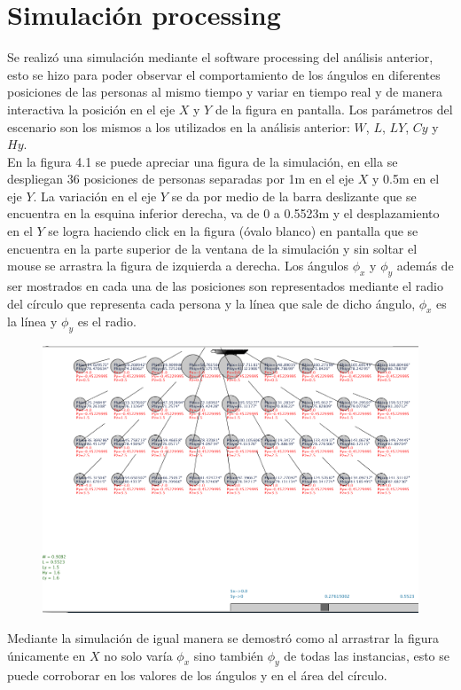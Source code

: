       
      \section{Simulación processing}
      Se realizó una simulación mediante el software processing del análisis anterior, esto se hizo para poder observar el comportamiento de los ángulos en diferentes posiciones de las personas al mismo tiempo y variar en tiempo real y de manera interactiva la posición en el eje $X$ y $Y$ de la figura en pantalla. Los parámetros del escenario son los mismos a los utilizados en la análisis anterior: $W$, $L$, $LY$, $Cy$ y $Hy$. \\
      En la figura 4.1 se puede apreciar una figura de la simulación, en ella se despliegan 36 posiciones de personas separadas por 1m en el eje $X$ y 0.5m en el eje $Y$. La variación en el eje $Y$ se da por medio de la barra deslizante que se encuentra en la esquina inferior derecha, va de 0 a 0.5523m y el desplazamiento en el $Y$ se logra haciendo click en la figura (óvalo blanco) en pantalla que se encuentra en la parte superior de la ventana de la simulación y sin soltar el mouse se arrastra la figura de izquierda a derecha. Los ángulos $\phi_x$ y $\phi_y$ además de ser mostrados en cada una de las posiciones son representados mediante el radio del círculo que representa cada persona y la línea que sale de dicho ángulo, $\phi_x$ es la línea y $\phi_y$ es el radio.\\
      \begin{figure}[htbp]
      	\centering
      	\includegraphics[width=1\textwidth]{./pictures/sim}
      	\caption{}\label{fig: figura}
      \end{figure}
      Mediante la simulación de igual manera se demostró como al arrastrar la figura únicamente en $X$ no solo varía $\phi_x$ sino también $\phi_y$ de todas las instancias, esto se puede corroborar en los valores de los ángulos y en el área del círculo.
      
